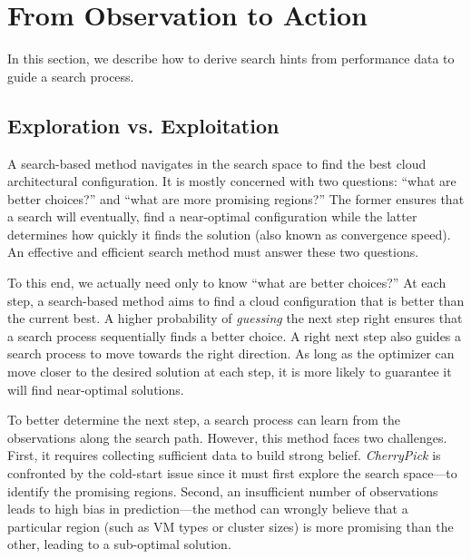 \section{From Observation to Action}
\label{sec:approach}
In this section, we describe how to derive search hints from performance data
to guide a search process.

\subsection{Exploration vs. Exploitation}

A search-based method navigates in the search space
to find the best cloud architectural configuration.
It is mostly concerned with
two questions:
``what are better choices?'' and
``what are more promising regions?''
The former ensures that a search will
eventually, find a near-optimal configuration
while
the latter determines how quickly it finds the solution
(also known as convergence speed).
An effective and efficient search method must answer
these two questions.

To this end, we actually need only to know ``what are better choices?''
At each step, a search-based method aims to find a cloud configuration
that is better than the current best.
A higher probability of \emph{guessing} the next step right
ensures that a search process sequentially finds a better choice.
A right next step also guides a search process
to move towards the right direction.
As long as the optimizer can move closer to the desired solution at each step,
it is more likely to guarantee it will find
near-optimal solutions.

To better determine the next step, a search process can learn
from the observations along the search path.
However, this method faces two challenges.
First, it requires collecting sufficient data to build strong belief.
\emph{CherryPick} is confronted by the cold-start issue
since it must first explore the search space---to identify the promising regions.
Second, an insufficient number of observations leads to
high bias in prediction---the method can wrongly believe that
a particular region (such as VM types or cluster sizes) is more promising
than the other, leading to a sub-optimal solution.

